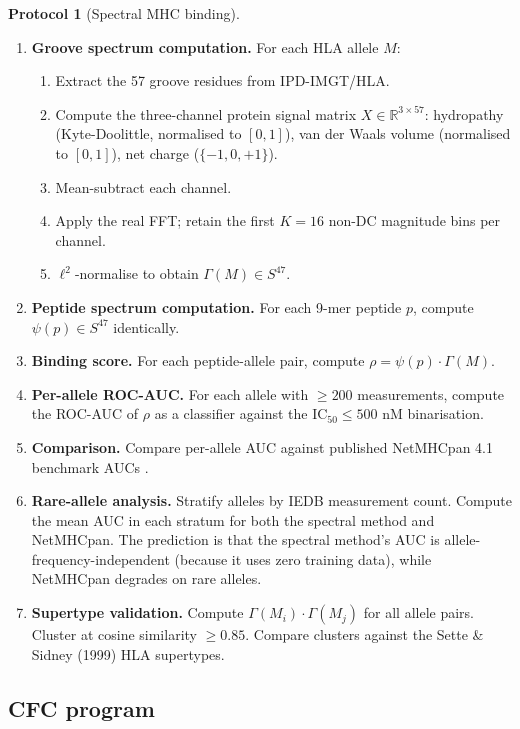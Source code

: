 \documentclass[11pt,a4paper]{article}
\theoremstyle{expthm}
\theoremstyle{definition}
\newtheorem{protocol}[theorem]{Protocol}
\theoremstyle{remark}
\newcommand{\R}{\mathbb{R}}
\begin{document}
\begin{protocol}[Spectral MHC binding]
\label{prot:mhc}
\leavevmode
\begin{enumerate}[leftmargin=1.4em,itemsep=3pt]
\item \textbf{Groove spectrum computation.} For each HLA allele $M$:
  \begin{enumerate}[label=(\roman*),leftmargin=1.8em]
  \item Extract the 57 groove residues from IPD-IMGT/HLA.
  \item Compute the three-channel protein signal matrix
    $X \in \R^{3 \times 57}$: hydropathy (Kyte-Doolittle, normalised to
    $[0,1]$), van der Waals volume (normalised to $[0,1]$), net charge
    ($\{-1, 0, +1\}$).
  \item Mean-subtract each channel.
  \item Apply the real FFT; retain the first $K = 16$ non-DC magnitude
    bins per channel.
  \item $\ell^2$-normalise to obtain
    $\Gamma(M) \in S^{47}$.
  \end{enumerate}
\item \textbf{Peptide spectrum computation.} For each 9-mer peptide $p$,
  compute $\psi(p) \in S^{47}$ identically.
\item \textbf{Binding score.} For each peptide-allele pair, compute
  $\rho = \psi(p) \cdot \Gamma(M)$.
\item \textbf{Per-allele ROC-AUC.} For each allele with $\geq 200$
  measurements, compute the ROC-AUC of $\rho$ as a classifier against
  the IC$_{50} \leq 500$ nM binarisation.
\item \textbf{Comparison.} Compare per-allele AUC against published
  NetMHCpan 4.1 benchmark AUCs \citep{reynisson2020}.
\item \textbf{Rare-allele analysis.} Stratify alleles by IEDB
  measurement count. Compute the mean AUC in each stratum for both the
  spectral method and NetMHCpan. The prediction is that the spectral
  method's AUC is allele-frequency-independent (because it uses zero
  training data), while NetMHCpan degrades on rare alleles.
\item \textbf{Supertype validation.} Compute
  $\Gamma(M_i) \cdot \Gamma(M_j)$ for all allele pairs. Cluster at
  cosine similarity $\geq 0.85$. Compare clusters against the Sette \&
  Sidney (1999) HLA supertypes.
\end{enumerate}
\end{protocol}

\subsection{CFC program}
\end{document}
